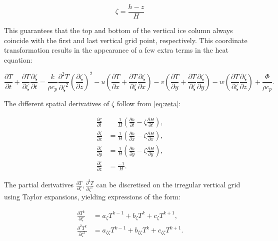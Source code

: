\documentclass{article}
\begin{document}
\begin{equation} \label{eq:zeta}
\zeta = \frac{h-z}{H}
\end{equation}

This guarantees that the top and bottom of the vertical ice column always coincide with the first and last vertical grid point, respectively. This coordinate transformation results in the appearance of a few extra terms in the heat equation:

\begin{equation}
\frac{\partial T}{\partial t} + \frac{\partial T}{\partial \zeta} \frac{\partial \zeta}{\partial t} =
\frac{k}{\rho c_p} \frac{\partial^2 T}{\partial \zeta^2} {\left( \frac{\partial \zeta}{\partial z} \right) }^2
- u \left( \frac{\partial T}{\partial x} + \frac{\partial T}{\partial \zeta} \frac{\partial \zeta}{\partial x} \right)
- v \left( \frac{\partial T}{\partial y} + \frac{\partial T}{\partial \zeta} \frac{\partial \zeta}{\partial y} \right)
- w \left( \frac{\partial T}{\partial \zeta} \frac{\partial \zeta}{\partial z} \right)
+ \frac{\Phi}{\rho c_p}.
\end{equation}

The different spatial derivatives of $\zeta$ follow from \eqref{eq:zeta}:

\begin{align}
\frac{\partial \zeta}{\partial t} &= \frac{1}{H} \left( \frac{\partial h}{\partial t} - \zeta \frac{\partial H}{\partial t} \right), \\
\frac{\partial \zeta}{\partial x} &= \frac{1}{H} \left( \frac{\partial h}{\partial x} - \zeta \frac{\partial H}{\partial x} \right), \\
\frac{\partial \zeta}{\partial y} &= \frac{1}{H} \left( \frac{\partial h}{\partial y} - \zeta \frac{\partial H}{\partial y} \right), \\
\frac{\partial \zeta}{\partial z} &= \frac{-1}{H}.
\end{align}

The partial derivatives $\frac{\partial T}{\partial \zeta}, \frac{\partial^2 T}{\partial \zeta^2}$ can be discretised on the irregular vertical grid using Taylor expansions, yielding expressions of the form:

\begin{align}
\frac{\partial T^k}{\partial \zeta} &= a_{\zeta} T^{k-1} + b_{\zeta} T^k + c_{\zeta} T^{k+1}, \\
\frac{\partial^2 T^k}{\partial \zeta^2} &= a_{\zeta \zeta} T^{k-1} + b_{\zeta \zeta} T^k + c_{\zeta \zeta} T^{k+1}.
\end{align}
\end{document}
